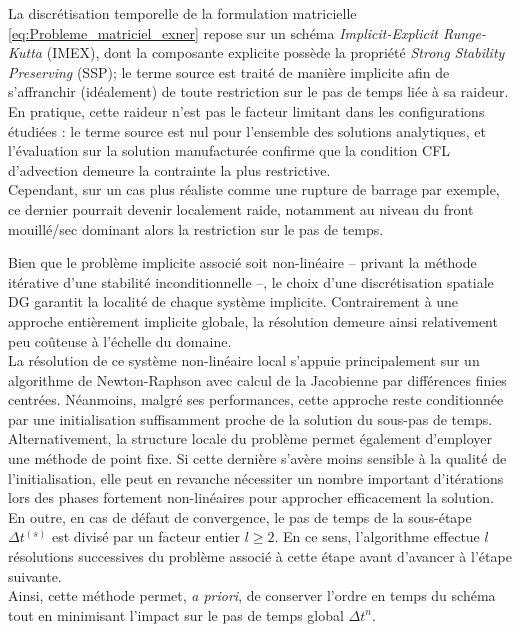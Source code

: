 \documentclass[11pt, a4paper, oneside]{report}
\begin{document}
\begin{samepage}
La discrétisation temporelle de la formulation matricielle \eqref{eq:Probleme_matriciel_exner} repose sur un schéma \textit{Implicit-Explicit Runge-Kutta} (IMEX), dont la composante explicite possède la propriété \textit{Strong Stability Preserving} (SSP); le terme source est traité de manière implicite afin de s'affranchir (idéalement) de toute restriction sur le pas de temps liée à sa raideur. \\
En pratique, cette raideur n'est pas le facteur limitant dans les configurations étudiées : le terme source est nul pour l'ensemble des solutions analytiques, et l'évaluation sur la solution manufacturée confirme que la condition CFL d'advection demeure la contrainte la plus restrictive. \\
Cependant, sur un cas plus réaliste comme une rupture de barrage par exemple, ce dernier pourrait devenir localement raide, notamment au niveau du front mouillé/sec dominant alors la restriction sur le pas de temps.

Bien que le problème implicite associé soit non-linéaire -- privant la méthode itérative d'une stabilité inconditionnelle --, le choix d'une discrétisation spatiale DG garantit la localité de chaque système implicite. Contrairement à une approche entièrement implicite globale, la résolution demeure ainsi relativement peu coûteuse à l'échelle du domaine. \\
La résolution de ce système non-linéaire local s'appuie principalement sur un algorithme de Newton-Raphson avec calcul de la Jacobienne par différences finies centrées. Néanmoins, malgré ses performances, cette approche reste conditionnée par une initialisation suffisamment proche de la solution du sous-pas de temps. \\
Alternativement, la structure locale du problème permet également d'employer une méthode de point fixe. Si cette dernière s'avère moins sensible à la qualité de l'initialisation, elle peut en revanche nécessiter un nombre important d'itérations lors des phases fortement non-linéaires pour approcher efficacement la solution. \\
En outre, en cas de défaut de convergence, le pas de temps de la sous-étape $\Delta t^{(s)}$ est divisé par un facteur entier $l \geq 2$. En ce sens, l'algorithme effectue $l$ résolutions successives du problème associé à cette étape avant d'avancer à l'étape suivante. \\
Ainsi, cette méthode permet, \textit{a priori}, de conserver l'ordre en temps du schéma tout en minimisant l'impact sur le pas de temps global $\Delta t^n$.


\end{samepage}
\end{document}
